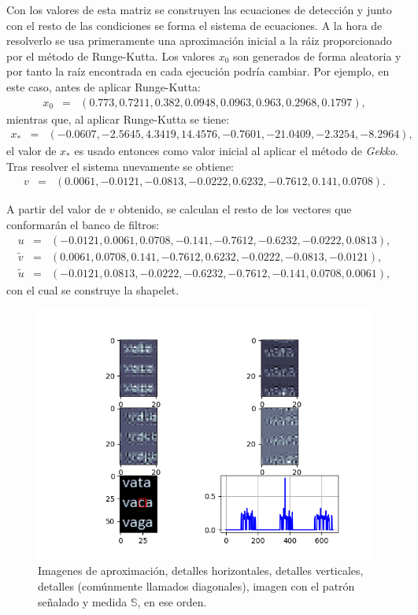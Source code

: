\par Con los valores de esta matriz se construyen las ecuaciones de detecci\'on y junto con el resto de las condiciones se forma el sistema de ecuaciones. A la hora de resolverlo se usa primeramente una aproximaci\'on inicial a la r\'aiz proporcionado por el m\'etodo de Runge-Kutta. Los valores $x_0$ son generados de forma aleatoria y por tanto la ra\'iz encontrada en cada ejecuci\'on podr\'ia cambiar. Por ejemplo, en este caso, antes de aplicar Runge-Kutta:
\begin{eqnarray}
x_0&=&(0.773,0.7211,0.382,0.0948,0.0963,0.963,0.2968,0.1797),\nonumber
\end{eqnarray}
mientras que, al aplicar Runge-Kutta se tiene:
\begin{eqnarray}
x_{\ast}&=&(-0.0607,-2.5645,4.3419,14.4576,-0.7601,-21.0409,-2.3254,-8.2964),\nonumber
\end{eqnarray}
el valor de $x_{\ast}$ es usado entonces como valor inicial al aplicar el m\'etodo de \textit{Gekko}. Tras resolver el sistema nuevamente se obtiene:
\begin{eqnarray}
v&=&(0.0061,-0.0121,-0.0813,-0.0222,0.6232,-0.7612,0.141,0.0708).\nonumber
\end{eqnarray}
\par A partir del valor de $v$ obtenido, se calculan el resto de los vectores que conformar\'an el banco de filtros:
\begin{eqnarray}
u&=&(-0.0121,0.0061,0.0708,-0.141,-0.7612,-0.6232,-0.0222,0.0813),\nonumber\\
\tilde{v}&=&(0.0061,0.0708,0.141,-0.7612,0.6232,-0.0222,-0.0813,-0.0121),\nonumber\\
\tilde{u}&=&(-0.0121,0.0813,-0.0222,-0.6232,-0.7612,-0.141,0.0708,0.0061),\nonumber
\end{eqnarray}
con el cual se construye la shapelet.\\

\begin{figure}[h]
\center
\includegraphics[scale=.7]{Graphics/CDetect.png}
\caption{Imagenes de aproximaci\'on, detalles horizontales, detalles verticales, detalles (com\'unmente llamados diagonales), imagen con el patr\'on se\~nalado y medida $\mathbb{S}$, en ese orden.}
\label{c-detected}
\end{figure}

